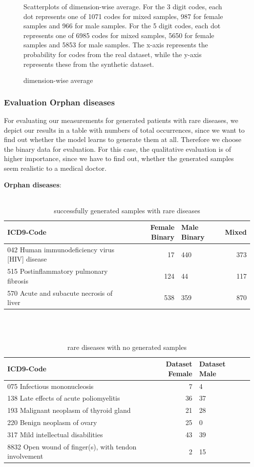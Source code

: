 \documentclass[11pt, a4paper]{book}
\begin{document}
\begin{figure}
\caption{dimension-wise average}
\small
\begin{flushleft}
Scatterplots of dimension-wise average. For the 3 digit codes, each dot represents one of 1071 codes for mixed samples, 987 for female samples and 966 for male samples. For the 5 digit codes, each dot represents one of 6985 codes for mixed samples, 5650 for female samples and 5853 for male samples. The x-axis represents the probability for codes from the real dataset, while the y-axis represents these from the synthetic dataset.
\end{flushleft}
\label{fig:figure3}
\end{figure}

\subsubsection{Evaluation Orphan diseases}
For evaluating our measurements for generated patients with rare diseases, we depict our results in a table with numbers of total occurrences, since we want to find out whether the model learns to generate them at all. 
Therefore we choose the binary data for evaluation.
For this case, the qualitative evaluation is of higher importance, since we have to find out, whether the generated samples seem realistic to a medical doctor.


\textbf{Orphan diseases}:
\\
\\
\begin{table}
\begin{tabularx}{\textwidth}{p{}|r|X|r}
ICD9-Code & Female Binary & Male Binary & Mixed\\
\hline
042 Human immunodeficiency virus [HIV] disease	& 17 & 440 & 373\\
515 Postinflammatory pulmonary fibrosis & 124 & 44 & 117\\
570 Acute and subacute necrosis of liver & 538	& 359 & 870\\
\end{tabularx}
\caption{\label{tab:rare-generataed}successfully generated samples with rare diseases}
\end{table}
\\
\\
\begin{table}
\begin{tabularx}{\textwidth}{p{}|r|X|r}
ICD9-Code & Dataset Female & Dataset Male\\
\hline
075 Infectious mononucleosis & 7 & 4\\
138 Late effects of acute poliomyelitis & 36 & 37 \\
193 Malignant neoplasm of thyroid gland & 21 & 28 \\
220 Benign neoplasm of ovary & 25	& 0\\
317 Mild intellectual disabilities & 43 & 39\\
8832 Open wound of finger(s), with tendon involvement & 2 & 15\\ 
\end{tabularx}
\caption{\label{tab:rare-not-generated}rare diseases with no generated samples}
\end{table}
	
\end{document}
